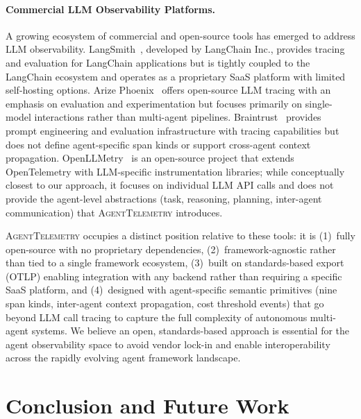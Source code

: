 \documentclass[sigconf,nonacm]{acmart}
\begin{document}
\paragraph{Commercial LLM Observability Platforms.}
A growing ecosystem of commercial and open-source tools has emerged to
address LLM observability.  LangSmith~\cite{langsmith}, developed by
LangChain Inc., provides tracing and evaluation for LangChain
applications but is tightly coupled to the LangChain ecosystem and
operates as a proprietary SaaS platform with limited self-hosting
options.  Arize Phoenix~\cite{arize_phoenix} offers open-source LLM
tracing with an emphasis on evaluation and experimentation but focuses
primarily on single-model interactions rather than multi-agent
pipelines.  Braintrust~\cite{braintrust} provides prompt engineering and
evaluation infrastructure with tracing capabilities but does not define
agent-specific span kinds or support cross-agent context propagation.
OpenLLMetry~\cite{openllmetry} is an open-source project that extends
OpenTelemetry with LLM-specific instrumentation libraries; while
conceptually closest to our approach, it focuses on individual LLM API
calls and does not provide the agent-level abstractions (task, reasoning,
planning, inter-agent communication) that \textsc{AgentTelemetry}
introduces.

\textsc{AgentTelemetry} occupies a distinct position relative to these
tools: it is (1)~fully open-source with no proprietary dependencies,
(2)~framework-agnostic rather than tied to a single framework ecosystem,
(3)~built on standards-based export (OTLP) enabling integration with any
backend rather than requiring a specific SaaS platform, and (4)~designed
with agent-specific semantic primitives (nine span kinds, inter-agent
context propagation, cost threshold events) that go beyond LLM call
tracing to capture the full complexity of autonomous multi-agent
systems.  We believe an open, standards-based approach is essential for
the agent observability space to avoid vendor lock-in and enable
interoperability across the rapidly evolving agent framework landscape.

\section{Conclusion and Future Work}
\label{sec:conclusion}
\end{document}
